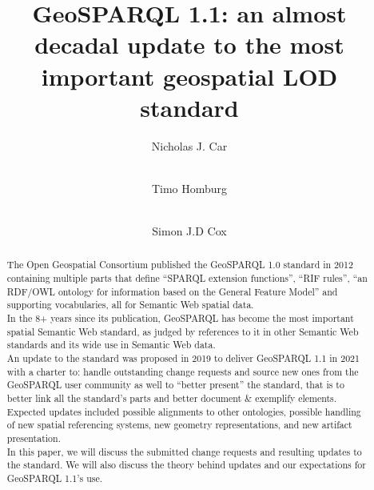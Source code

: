 \documentclass[runningheads]{llncs}
\begin{document}
\title{GeoSPARQL 1.1: an almost decadal update to the most important geospatial LOD standard}

\author{
    Nicholas J. Car \and \\
    Timo Homburg \and \\
    Simon J.D Cox
}



\maketitle

\begin{abstract}
The Open Geospatial Consortium published the GeoSPARQL 1.0 standard in 2012 containing multiple 
parts that define ``SPARQL extension functions'', ``RIF rules'', ``an RDF/OWL ontology for 
information based on the General Feature Model'' and supporting vocabularies, all for Semantic 
Web spatial data.\\

In the 8+ years since its publication, GeoSPARQL has become the most important spatial Semantic 
Web standard, as judged by references to it in other Semantic Web standards and its wide use in 
Semantic Web data.\\

An update to the standard was proposed in 2019 to deliver GeoSPARQL 1.1 in 2021 with a charter to: 
handle outstanding change requests and source new ones from the GeoSPARQL user community as well 
to ``better present'' the standard, that is to better link all the standard’s parts and better 
document \& exemplify elements. Expected updates included possible alignments to other ontologies, 
possible handling of new spatial referencing systems, new geometry representations, and new artifact 
presentation.\\

In this paper, we will discuss the submitted change requests and resulting updates to the standard. 
We will also discuss the theory behind updates and our expectations for GeoSPARQL 1.1's use.

\end{abstract}
\end{document}
